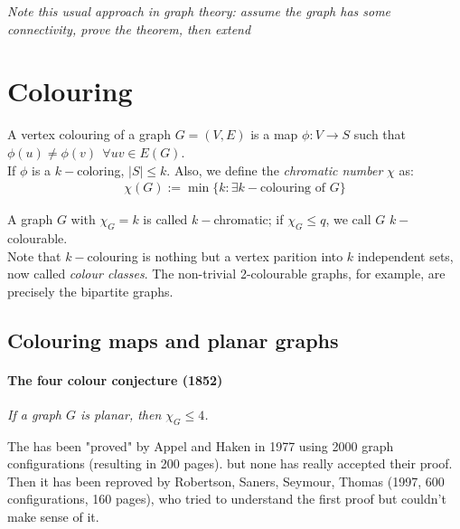 \documentclass[11pt]{book}
\begin{document}
\begin{enumerate}
\begin{enumerate}
\begin{enumerate}
\begin{enumerate}
								\end{enumerate}
						\end{enumerate} 
				\end{enumerate}
		\end{enumerate}
		
		\textit{Note this usual approach in graph theory: assume the graph has some connectivity, prove the theorem, then extend}
		
		
\chapter{Colouring}
A vertex colouring of a graph $G = (V,E)$ is a map $\phi: V \rightarrow S$ such that $\phi(u) \neq \phi(v) ~~\forall uv \in E(G)$.\\

If $\phi$ is a $k-$coloring, $|S| \leq k$. Also, we define the \textit{chromatic number} $\chi$ as:
\begin{eqnarray}
	\chi (G) := \min \{ k : \exists k-\text{colouring of }G \}
\end{eqnarray}

A graph $G$ with $\chi_{G} = k$ is called $k-$chromatic; if $\chi_{G} \leq q$, we call $G$ $k-$colourable.\\

Note that $k-$colouring is nothing but a vertex parition into $k$ independent sets, now called \textit{colour classes}. The non-trivial 2-colourable graphs, for example, are precisely the bipartite graphs.

	\section{Colouring maps and planar graphs}
		\subsubsection{The four colour conjecture (1852)}
		\textit{If a graph $G$ is planar, then $\chi_{G} \leq 4$.	\\}
		
		The has been "proved" by Appel and Haken in 1977 using 2000 graph configurations (resulting in 200 pages). but none has really accepted their proof. \\
		
		Then it has been reproved by Robertson, Saners, Seymour, Thomas (1997, 600 configurations, 160 pages), who tried to understand the first proof but couldn't make sense of it. \\
		
\end{document}
